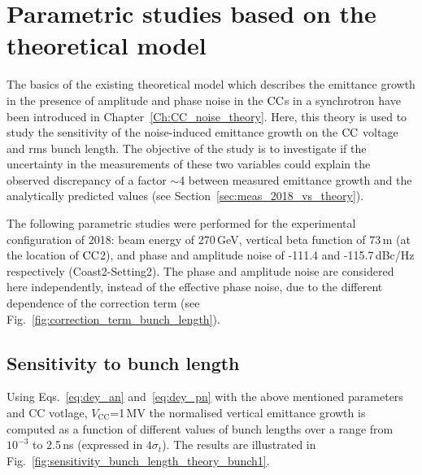 \section{Parametric studies based on the theoretical model}\label{sec:paramteric_studies_theory}

The basics of the existing theoretical model which describes the emittance growth in the presence of amplitude and phase noise in the ${\mathrm{CC}}$s in a synchrotron have been introduced in Chapter~\ref{Ch:CC_noise_theory}. Here, this theory is used to study the sensitivity of the noise-induced emittance growth on the ${\mathrm{CC}}$ voltage and rms bunch length. The objective of the study is to investigate if the uncertainty in the measurements of these two variables could explain the observed discrepancy of a factor $\sim$4 between measured emittance growth and the analytically predicted values (see Section~\ref{sec:meas_2018_vs_theory}).

The following parametric studies were performed for the experimental configuration of 2018: beam energy of 270\,GeV, vertical beta function of 73\,m (at the location of ${\mathrm{CC}}$2), and phase and amplitude noise of -111.4 and -115.7\,dBc/Hz respectively (Coast2-Setting2). The phase and amplitude noise are considered here independently, instead of the effective phase noise, due to the different dependence of the correction term (see Fig.~\ref{fig:correction_term_bunch_length}).

\subsection{Sensitivity to bunch length}\label{subsec:bunch_length_dependence}
Using Eqs.~\eqref{eq:dey_an} and~\eqref{eq:dey_pn} with the above mentioned parameters and CC votlage, $V_\mathrm{CC}$=1\,MV the normalised vertical emittance growth is computed as a function of different values of bunch lengths over a range from $10^{-3}$ to 2.5\,ns (expressed in $4\sigma_t$). The results are illustrated in Fig.~\ref{fig:sensitivity_bunch_length_theory_bunch1}. 

